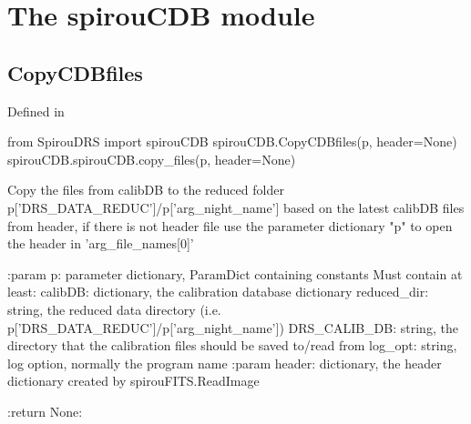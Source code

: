 
\clearpage
\newpage
\noindent\begin{minipage}{\textwidth}
\section{The spirouCDB module}
\label{ch:the_module:spirouCDB}

\subsection{CopyCDBfiles}

Defined in \spirouCDB{}

\begin{pythonbox}
from SpirouDRS import spirouCDB
spirouCDB.CopyCDBfiles(p, header=None)
spirouCDB.spirouCDB.copy_files(p, header=None)
\end{pythonbox}

\begin{pythondocstring}
Copy the files from calibDB to the reduced folder
   p['DRS_DATA_REDUC']/p['arg_night_name']
based on the latest calibDB files from header, if there is not header file
use the parameter dictionary "p" to open the header in 'arg_file_names[0]'

:param p: parameter dictionary, ParamDict containing constants
    Must contain at least:
            calibDB: dictionary, the calibration database dictionary
            reduced_dir: string, the reduced data directory
                         (i.e. p['DRS_DATA_REDUC']/p['arg_night_name'])
            DRS_CALIB_DB: string, the directory that the calibration
                          files should be saved to/read from
            log_opt: string, log option, normally the program name
:param header: dictionary, the header dictionary created by
               spirouFITS.ReadImage

:return None:
\end{pythondocstring}
\end{minipage}

